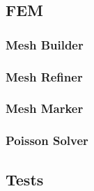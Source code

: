 \subsection{FEM}
\subsubsection{Mesh Builder} \label{mesh_builder}


\newpage
\subsubsection{Mesh Refiner} \label{mesh_refiner}


\newpage
\subsubsection{Mesh Marker} \label{mesh_marker}


\newpage
\subsubsection{Poisson Solver} \label{mesh_solver}


\newpage
\subsection{Tests}